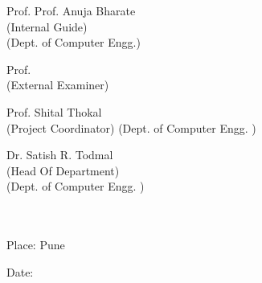 \documentclass[12pt,a4paper]
{article}
\numberwithin{table}{section}
\begin{document}
\vspace{0.9 cm}
\begin{minipage}[t]{7cm}
\flushleft
\hspace{0.3in} Prof. Prof. Anuja Bharate\\
\hspace{0.55in}(Internal Guide)\\
\hspace{0.30in}(Dept. of Computer Engg.)
\end{minipage}
\hspace{0.5 in}
\begin{minipage}[t]{7cm}
\flushright
\vspace{0.1 in}
 Prof.\hspace*{0.95 in} \\
(External Examiner)
\end{minipage}
\vspace{0.7 in}





\begin{minipage}[t]{7cm}
\flushleft
\hspace{0.1in}Prof. Shital Thokal\\
\hspace{0.35in}(Project Coordinator) 
\hspace{0.9 in}(Dept. of Computer Engg.   )
\end{minipage}
\hspace{0.5 in}
\begin{minipage}[t]{7cm}
\flushright
\hspace{0.65in}Dr. Satish R. Todmal\\
\hspace{0.65in}(Head Of Department)\\
\hspace{0.9 in}(Dept. of Computer Engg.   )
\\
\end{minipage}
\\
 
\newline
\newline
\\
\hspace{0.5in}
Place: Pune \hspace{3.5in} 

\hspace{0.5 in} Date: 

	

\end{document}
